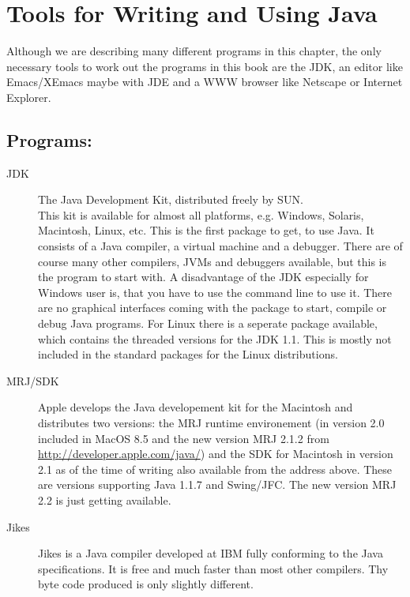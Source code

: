 \section{Tools for Writing and Using Java}

Although we are describing many different programs in this chapter, the only 
necessary tools to work out the programs in this book are the JDK, an editor
like Emacs/XEmacs maybe with JDE and a WWW browser like Netscape or
Internet Explorer. 

\subsection{Programs:} 
\begin{description}
\item[JDK]  The Java Development Kit, distributed freely by SUN.\\
        This kit is available for almost all platforms, e.g. Windows,
        Solaris, Macintosh, Linux, etc. This is the first package to get,
        to use Java. It consists of a Java compiler, a virtual machine 
        and a debugger. There
        are of course many other compilers, JVMs and debuggers
        available, but this is the program to start with. A disadvantage
        of the JDK especially for Windows user is, that you have to use the
        command line to use it. There are no graphical interfaces  coming with the
        package to start, compile or debug Java programs.
        For Linux there is  a seperate package available, which contains
        the threaded versions for the JDK 1.1. This is mostly not
        included in the standard packages for the Linux distributions.
\item[MRJ/SDK]  Apple develops the Java developement kit for the Macintosh and
  distributes two versions: the MRJ runtime environement (in version 2.0 included
  in MacOS 8.5 and the new version MRJ 2.1.2 from \href{http://developer.apple.com/java/}%
  {http://developer.apple.com/java/}) and the SDK for Macintosh in version
  2.1 as of the time of writing also available from the address above. These are
  versions supporting Java 1.1.7 and Swing/JFC. The new version MRJ 2.2
        is just getting available.
\item[Jikes]  
  Jikes is a Java compiler developed at IBM fully conforming
  to the Java specifications. It is free and much faster than most
  other compilers. Thy byte code produced is only slightly different.

\end{description}
